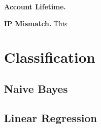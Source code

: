 \documentclass[preprint]{acm_proc_article-sp}
\begin{document}
\textbf{Account Lifetime.}

\textbf{IP Mismatch.} This 




\section{Classification}

\subsection{Naive Bayes}

%
%
\subsection{Linear Regression}
\end{document}
